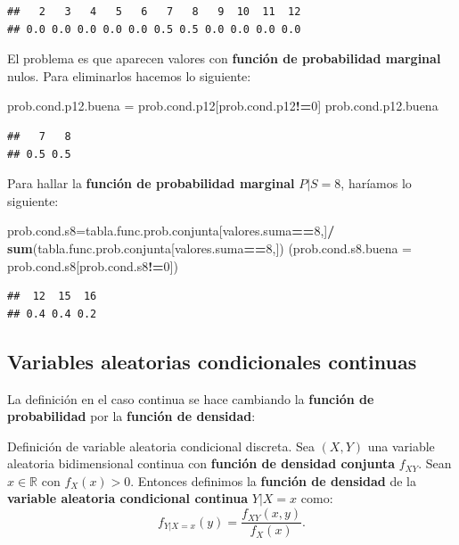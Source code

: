 \documentclass[]{book}
\newenvironment{Shaded}{\begin{snugshade}}{\end{snugshade}}
\newcommand{\DataTypeTok}[1]{\textcolor[rgb]{0.13,0.29,0.53}{#1}}
\newcommand{\DecValTok}[1]{\textcolor[rgb]{0.00,0.00,0.81}{#1}}
\newcommand{\KeywordTok}[1]{\textcolor[rgb]{0.13,0.29,0.53}{\textbf{#1}}}
\newcommand{\NormalTok}[1]{#1}
\newcommand{\OperatorTok}[1]{\textcolor[rgb]{0.81,0.36,0.00}{\textbf{#1}}}
\newcommand{\StringTok}[1]{\textcolor[rgb]{0.31,0.60,0.02}{#1}}
\begin{document}
\begin{verbatim}
##   2   3   4   5   6   7   8   9  10  11  12 
## 0.0 0.0 0.0 0.0 0.0 0.5 0.5 0.0 0.0 0.0 0.0
\end{verbatim}

El problema es que aparecen valores con \textbf{función de probabilidad marginal} nulos. Para eliminarlos hacemos lo siguiente:

\begin{Shaded}
\begin{Highlighting}[]
\NormalTok{prob.cond.p12.buena =}\StringTok{ }\NormalTok{prob.cond.p12[prob.cond.p12}\OperatorTok{!=}\DecValTok{0}\NormalTok{]}
\NormalTok{prob.cond.p12.buena}
\end{Highlighting}
\end{Shaded}

\begin{verbatim}
##   7   8 
## 0.5 0.5
\end{verbatim}

Para hallar la \textbf{función de probabilidad marginal} \(P|S=8\), haríamos lo siguiente:

\begin{Shaded}
\begin{Highlighting}[]
\NormalTok{prob.cond.s8=tabla.func.prob.conjunta[valores.suma}\OperatorTok{==}\DecValTok{8}\NormalTok{,]}\OperatorTok{/}
\StringTok{  }\KeywordTok{sum}\NormalTok{(tabla.func.prob.conjunta[valores.suma}\OperatorTok{==}\DecValTok{8}\NormalTok{,])}
\NormalTok{(}\DataTypeTok{prob.cond.s8.buena =}\NormalTok{ prob.cond.s8[prob.cond.s8}\OperatorTok{!=}\DecValTok{0}\NormalTok{])}
\end{Highlighting}
\end{Shaded}

\begin{verbatim}
##  12  15  16 
## 0.4 0.4 0.2
\end{verbatim}

\hypertarget{variables-aleatorias-condicionales-continuas}{%
\subsection{Variables aleatorias condicionales continuas}\label{variables-aleatorias-condicionales-continuas}}

La definición en el caso continua se hace cambiando la \textbf{función de probabilidad} por la \textbf{función de densidad}:

Definición de variable aleatoria condicional discreta.
Sea \((X,Y)\) una variable aleatoria bidimensional continua con \textbf{función de densidad conjunta} \(f_{XY}\). Sean \(x\in\mathbb{R}\) con \(f_X(x)>0\). Entonces definimos la \textbf{función de densidad} de la \textbf{variable aleatoria condicional continua} \(Y|X=x\) como:
\[
f_{Y|X=x}(y)=\frac{f_{XY}(x,y)}{f_X(x)}.
\]
\end{document}
